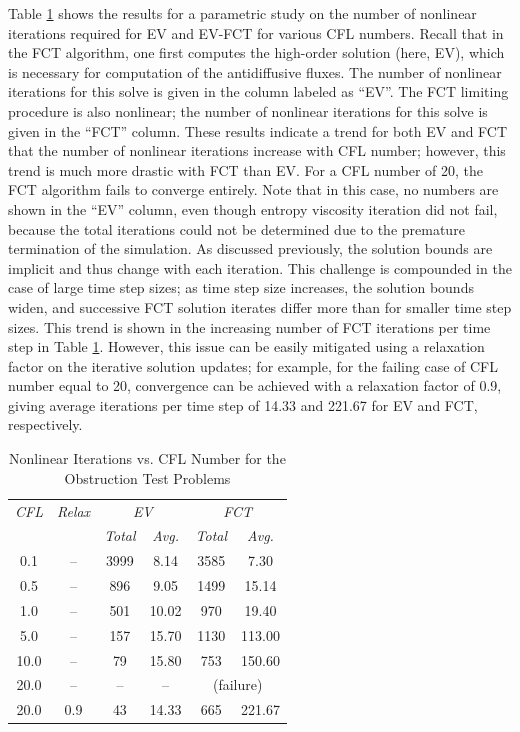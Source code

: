 Table \ref{tab:obstruction_iterations} shows the results for a parametric study
on the number of nonlinear iterations required for EV and EV-FCT for various
CFL numbers. Recall that in the FCT algorithm, one first computes the high-order solution
(here, EV), which is necessary for computation of the antidiffusive fluxes.
The number of nonlinear iterations for this solve is given in the column
labeled as ``EV''. The FCT limiting procedure is also nonlinear; the number
of nonlinear iterations for this solve is given in the ``FCT'' column.
These results indicate a trend for both EV and FCT that the number of nonlinear
iterations increase with CFL number; however, this trend is much more drastic
with FCT than EV. For a CFL number of 20, the FCT algorithm fails to converge
entirely. Note that in this case, no numbers are shown in the ``EV'' column,
even though entropy viscosity iteration did not fail,
because the total iterations could not be determined due
to the premature termination of the simulation.
As discussed previously, the solution bounds are implicit and thus change
with each iteration. This challenge is compounded in the case of large time
step sizes; as time step size increases, the solution bounds widen, and
successive FCT solution iterates differ more than for smaller time step sizes.
This trend is shown in the increasing number of FCT iterations per time step
in Table \ref{tab:obstruction_iterations}. However, this issue can be easily mitigated
using a relaxation factor on the iterative solution updates; for example, for
the failing case of CFL number equal to 20, convergence can be achieved with a
relaxation factor of 0.9, giving average iterations per time step of
14.33 and 221.67 for EV and FCT, respectively.

\begin{table}[htb]\caption{Nonlinear Iterations vs. CFL Number for the
  Obstruction Test Problems}
\label{tab:obstruction_iterations}
\centering
\begin{tabular}{c c c c c c}\hline
\emph{CFL} & \emph{Relax} & \multicolumn{2}{c}{\emph{EV}} & \multicolumn{2}{c}{\emph{FCT}}\\
           &              & \emph{Total} & \emph{Avg.}    &  \emph{Total} & \emph{Avg.}\\\hline
0.1        & --  & 3999 &  8.14 & 3585 &   7.30\\
0.5        & --  & 896  &  9.05 & 1499 &  15.14\\
1.0        & --  & 501  & 10.02 &  970 &  19.40\\
5.0        & --  & 157  & 15.70 & 1130 & 113.00\\
10.0       & --  & 79   & 15.80 &  753 & 150.60\\
20.0       & --  & --   &    -- & \multicolumn{2}{c}{(failure)}\\
20.0       & 0.9 & 43   & 14.33 &  665 & 221.67 \\
\hline\end{tabular}
\end{table}

